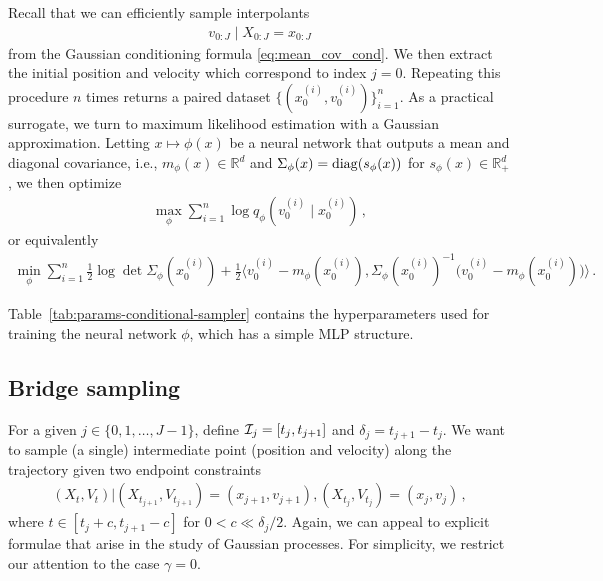 \documentclass[12pt]{article}
\theoremstyle{plain}
\theoremstyle{plain}
\theoremstyle{remark}
\newcommand{\R}{\mathbb{R}}
\newcommand{\1}{\bm{1}}
\theoremstyle{plain}
\theoremstyle{definition}
\theoremstyle{remark}
\begin{document}
Recall that we can efficiently sample interpolants
\begin{align*}
    v_{0:J}\mid X_{0:J} = x_{0:J}
\end{align*}
from the Gaussian conditioning formula \eqref{eq:mean_cov_cond}. We then extract the initial position and velocity which correspond to index $j=0$.
Repeating this procedure $n$ times returns a paired dataset $\{(x_0^{(i)}, v_0^{(i)})\}_{i=1}^n$. As a practical surrogate, we turn to maximum likelihood estimation with a Gaussian approximation. Letting $x\mapsto \phi(x)$ be a neural network that outputs a mean and diagonal covariance, i.e., $m_\phi(x)\in \R^d$ and $\Sigma_\phi(x) = {\rm diag}(s_\phi(x))$ for $s_\phi(x) \in \R^d_+$, we then optimize
\begin{align*}
    \max_\phi \sum_{i=1}^n \log q_\phi(v_0^{(i)}\mid x_0^{(i)})\,,
\end{align*}
or equivalently
\begin{align}
    \min_\phi \sum_{i=1}^n
    \frac{1}{2}\log\det \Sigma_\phi(x_0^{(i)})
    + \frac{1}{2}\langle v_0^{(i)} - m_\phi(x_0^{(i)}),
    \Sigma_{\phi}(x_0^{(i)})^{-1}\bigl(v_0^{(i)} - m_\phi(x_0^{(i)})\bigr)\rangle\,.
\end{align}

Table~\ref{tab:params-conditional-sampler} contains the hyperparameters used for training the neural network $\phi$, which has a simple MLP structure.

\subsection{Bridge sampling}\label{sec:bridge_sampling}
For a given $j \in \{0,1,\ldots,J-1\}$, define ${\cal I}_j = [t_{j},t_{j+1}]$ and $\delta_{j} = t_{j+1} - t_j$. We want to sample (a single) intermediate point (position and velocity) along the trajectory given two endpoint constraints
\begin{align*}
    (X_t,V_t) | (X_{t_{j+1}},V_{t_{j+1}}) = (x_{j+1},v_{j+1}), (X_{t_{j}},V_{t_{j}}) = (x_j,v_j)\,,
\end{align*}
where $t \in [t_j + c, t_{j+1} - c]$ for $0 < c \ll \delta_j/2$. Again, we can appeal to explicit formulae that arise in the study of Gaussian processes. For simplicity, we restrict our attention to the case $\gamma=0$.
\end{document}
